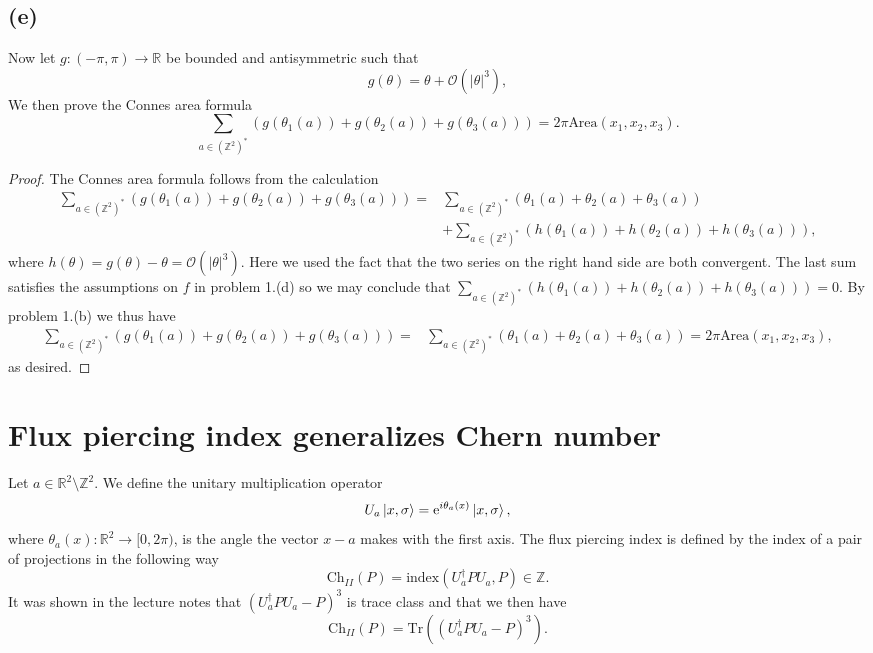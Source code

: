 \documentclass[a4paper,11pt]{article}
\newcommand{\euler}[1]{\text{e}^{#1}}
\newcommand{\abs}[1]{\left\lvert #1 \right\rvert}
\newcommand{\trace}[1]{\text{Tr}\left(#1\right)}
\newcommand{\R}{\mathbb{R}}
\newcommand{\Z}{\mathbb{Z}}
\newcommand{\Area}{\text{Area}}
\numberwithin{equation}{section}
\begin{document}
\subsection*{(e)}
Now let $ g:(-\pi,\pi)\to\R $ be bounded and antisymmetric such that\begin{equation}
g(\theta)=\theta+\mathcal{O}(\abs{\theta}^3),
\end{equation}
We then prove the Connes area formula\begin{equation}
\sum_{a\in(\Z^2)^*}\left(g(\theta_1(a))+g(\theta_2(a))+g(\theta_3(a))\right)=2\pi\Area(x_1,x_2,x_3).
\end{equation}

\begin{proof}
The Connes area formula follows from the calculation \begin{equation}
\begin{aligned}
\sum_{a\in(\Z^2)^*}\left(g(\theta_1(a))+g(\theta_2(a))+g(\theta_3(a))\right)=&\sum_{a\in(\Z^2)^*}\left(\theta_1(a)+\theta_2(a)+\theta_3(a)\right)\\&+\sum_{a\in(\Z^2)^*}\left(h(\theta_1(a))+h(\theta_2(a))+h(\theta_3(a))\right),
\end{aligned}
\end{equation}
where $ h(\theta)=g(\theta)-\theta=\mathcal{O}(\abs{\theta}^3) $. Here we used the fact that the two series on the right hand side are both convergent. The last sum satisfies the assumptions on $ f $ in problem 1.(d) so we may conclude that $ \sum_{a\in(\Z^2)^*}\left(h(\theta_1(a))+h(\theta_2(a))+h(\theta_3(a))\right)=0 $. By problem 1.(b) we thus have \begin{equation}
\begin{aligned}
\sum_{a\in(\Z^2)^*}\left(g(\theta_1(a))+g(\theta_2(a))+g(\theta_3(a))\right)=&\sum_{a\in(\Z^2)^*}\left(\theta_1(a)+\theta_2(a)+\theta_3(a)\right)=2\pi\Area(x_1,x_2,x_3),
\end{aligned}
\end{equation}
as desired.
\end{proof}
\section{Flux piercing index generalizes Chern number}
Let $ a\in\R^2\setminus\Z^2 $. We define the unitary multiplication operator\begin{equation}
U_a\ket{x,\sigma}=\euler{i\theta_a(x)}\ket{x,\sigma},
\end{equation}
where $ \theta_a(x):\R^2\to[0,2\pi) $, is the angle the vector $ x-a $ makes with the first axis. The flux piercing index is defined by the index of a pair of projections in the following way\begin{equation}
\text{Ch}_{II}(P)=\text{index}(U_a^\dagger PU_a,P)\in\Z.
\end{equation}
It was shown in the lecture notes that $ (U_a^\dagger PU_a-P)^3 $ is trace class and that we then have \begin{equation}
\text{Ch}_{II}(P)=\trace{(U_a^\dagger PU_a-P)^3}.
\end{equation}
\end{document}
